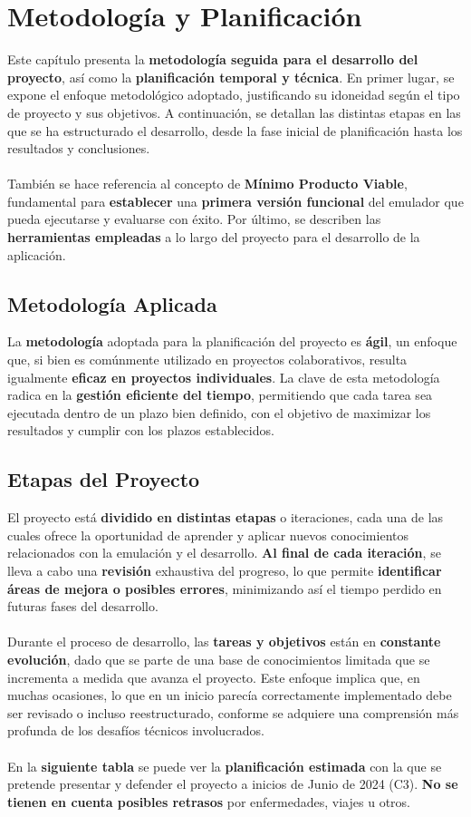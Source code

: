 \chapter{Metodología y Planificación}
\label{planificacion}

Este capítulo presenta la \textbf{metodología seguida para el desarrollo del proyecto}, así como la \textbf{planificación temporal y técnica}. En primer lugar, se expone el enfoque metodológico adoptado, justificando su idoneidad según el tipo de proyecto y sus objetivos. A continuación, se detallan las distintas etapas en las que se ha estructurado el desarrollo, desde la fase inicial de planificación hasta los resultados y conclusiones.
\\\\
También se hace referencia al concepto de \textbf{Mínimo Producto Viable}, fundamental para \textbf{establecer} una \textbf{primera versión funcional} del emulador que pueda ejecutarse y evaluarse con éxito. Por último, se describen las \textbf{herramientas empleadas} a lo largo del proyecto para el desarrollo de la aplicación.

\section{Metodología Aplicada}
La \textbf{metodología} adoptada para la planificación del proyecto es \textbf{ágil}, un enfoque que, si bien es comúnmente utilizado en proyectos colaborativos, resulta igualmente \textbf{eficaz en proyectos individuales}. La clave de esta metodología radica en la \textbf{gestión eficiente del tiempo}, permitiendo que cada tarea sea ejecutada dentro de un plazo bien definido, con el objetivo de maximizar los resultados y cumplir con los plazos establecidos.

\section{Etapas del Proyecto}
El proyecto está \textbf{dividido en distintas etapas} o iteraciones, cada una de las cuales ofrece la oportunidad de aprender y aplicar nuevos conocimientos relacionados con la emulación y el desarrollo. \textbf{Al final de cada iteración}, se lleva a cabo una \textbf{revisión} exhaustiva del progreso, lo que permite \textbf{identificar áreas de mejora o posibles errores}, minimizando así el tiempo perdido en futuras fases del desarrollo.
\\\\
Durante el proceso de desarrollo, las \textbf{tareas y objetivos} están en \textbf{constante evolución}, dado que se parte de una base de conocimientos limitada que se incrementa a medida que avanza el proyecto. Este enfoque implica que, en muchas ocasiones, lo que en un inicio parecía correctamente implementado debe ser revisado o incluso reestructurado, conforme se adquiere una comprensión más profunda de los desafíos técnicos involucrados.
\\\\
En la \textbf{siguiente tabla} se puede ver la \textbf{planificación estimada} con la que se pretende presentar y defender el proyecto a inicios de Junio de 2024 (C3). \textbf{No se tienen en cuenta posibles retrasos} por enfermedades, viajes u otros.

